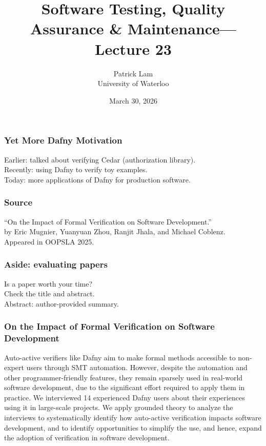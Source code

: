 \documentclass{beamer}
\title{Software Testing, Quality Assurance \& Maintenance---Lecture 23}
\author{Patrick Lam\\University of Waterloo}
\date{March 30, 2026}
\newenvironment{changemargin}[1]{%
  \begin{list}{}{%
    \setlength{\topsep}{0pt}%
    \setlength{\leftmargin}{#1}%
    \setlength{\rightmargin}{1em}
    \setlength{\listparindent}{\parindent}%
    \setlength{\itemindent}{\parindent}%
    \setlength{\parsep}{\parskip}%
  }%
  \item[]}{\end{list}}
\begin{document}
\begin{frame}
  \titlepage
\end{frame}


\begin{frame}
  \frametitle{Yet More Dafny Motivation}
  \begin{changemargin}{2cm}
    {    \Large
      Earlier: talked about verifying Cedar (authorization library).\\[1em]
      
      Recently: using Dafny to verify toy examples.\\[1em]

      Today: more applications of Dafny for production software.
}
  \end{changemargin}
\end{frame}

\begin{frame}
  \frametitle{Source}
  \begin{changemargin}{1cm}
    {    \Large
      ``On the Impact of Formal Verification on Software Development.''\\
      by       Eric Mugnier, Yuanyuan Zhou, Ranjit Jhala, and Michael Coblenz.\\
      Appeared in OOPSLA 2025.

}
  \end{changemargin}
\end{frame}

\begin{frame}
  \frametitle{Aside: evaluating papers}
  \begin{changemargin}{1cm}
    {    \Large
      Is a paper worth your time?\\[1em]
      Check the title and abstract.\\
      Abstract: author-provided summary.
}
  \end{changemargin}
\end{frame}


\begin{frame}
  \frametitle{On the Impact of \alert{Formal Verification} on \alert{Software Development}}
  \begin{changemargin}{1cm}
Auto-active verifiers like Dafny aim to make formal methods accessible to non-expert users through SMT automation. However, despite the automation and other programmer-friendly features, they remain \alert{sparsely used in real-world software development}, due to the significant effort required to apply them in practice. We interviewed \alert{14 experienced Dafny users} about their experiences using it in \alert{large-scale projects}. We apply grounded theory to analyze the interviews to \alert{systematically identify how auto-active verification impacts software development}, and to identify opportunities to simplify the use, and hence, expand the adoption of verification in software development.
  \end{changemargin}
\end{frame}
\end{document}
